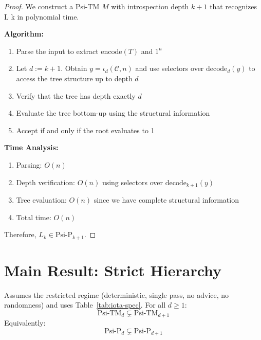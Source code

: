 \begin{proof}
We construct a Psi-TM $M$ with introspection depth $k+1$ that recognizes L k in polynomial time.

\textbf{Algorithm:}
\begin{enumerate}
\item Parse the input to extract $\text{encode}(T)$ and $1^n$
\item Let $d := k{+}1$. Obtain $y=\iota_d(\mathcal{C},n)$ and use selectors over $\mathrm{decode}_{d}(y)$ to access the tree structure up to depth $d$
\item Verify that the tree has depth exactly $d$
\item Evaluate the tree bottom-up using the structural information
\item Accept if and only if the root evaluates to 1
\end{enumerate}

\textbf{Time Analysis:}
\begin{enumerate}
\item Parsing: $O(n)$
\item Depth verification: $O(n)$ using selectors over $\mathrm{decode}_{k+1}(y)$
\item Tree evaluation: $O(n)$ since we have complete structural information
\item Total time: $O(n)$
\end{enumerate}

Therefore, $L_k \in \text{Psi-P}_{k+1}$.
\end{proof}

\section{Main Result: Strict Hierarchy}

\begin{theorem}
Assumes the restricted regime (deterministic, single pass, no advice, no randomness) and uses Table~\ref{tab:iota-spec}.
\label{thm:strict-hierarchy-2}
For all $d \geq 1$:
$$\text{Psi-TM}_d \subsetneq \text{Psi-TM}_{d+1}$$
Equivalently:
$$\text{Psi-P}_d \subsetneq \text{Psi-P}_{d+1}$$
\end{theorem}

